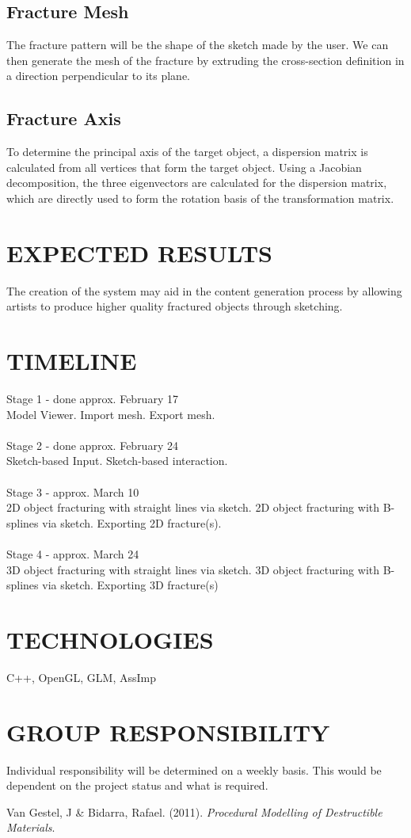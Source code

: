 \documentclass[titlepage, 11pt]{article}
\begin{document}
\subsection{Fracture Mesh}
The fracture pattern will be the shape of the sketch made by the user. We can then generate the mesh of the fracture by extruding the cross-section definition in a direction perpendicular to its plane.
\subsection{Fracture Axis}
To determine the principal axis of the target object, a dispersion matrix is calculated from all vertices that form the target object. Using a Jacobian decomposition, the three eigenvectors are calculated for the dispersion matrix, which are directly used to form the rotation basis of the transformation matrix.

\section{EXPECTED RESULTS}
The creation of the system may aid in the content generation process by allowing artists to produce higher quality fractured objects through sketching.

\section{TIMELINE}
Stage 1 - done approx. February 17\\
Model Viewer. Import mesh. Export mesh.\\
\\
Stage 2 - done approx. February 24\\
Sketch-based Input. Sketch-based interaction.\\
\\
Stage 3 - approx. March 10\\
2D object fracturing with straight lines via sketch. 2D object fracturing with B-splines via sketch. Exporting 2D fracture(s).\\
\\
Stage 4 - approx. March 24\\
3D object fracturing with straight lines via sketch. 3D object fracturing with B-splines via sketch.
Exporting 3D fracture(s)

\section{TECHNOLOGIES}
C++, OpenGL, GLM, AssImp

\section{GROUP RESPONSIBILITY}
Individual responsibility will be determined on a weekly basis. This would be dependent on the project status and what is required. 

\begin{thebibliography}{1}

 Van Gestel, J \& Bidarra, Rafael. (2011). {\em Procedural Modelling of Destructible Materials}.

\end{thebibliography}
\end{document}
